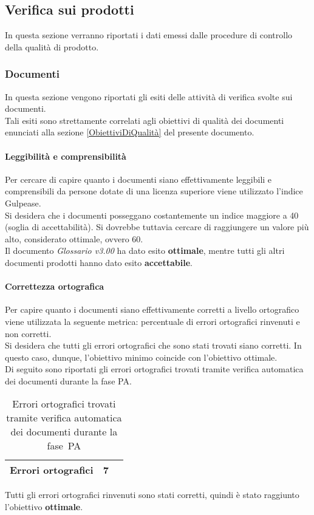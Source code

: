 \documentclass[../PianoDiQualifica.tex]{subfiles}
\begin{document}
\begin{appendices}
			
	\subsection{Verifica sui prodotti}
	In questa sezione verranno riportati i dati emessi dalle procedure di controllo della qualità di prodotto\g.
		\subsubsection{Documenti}
		In questa sezione vengono riportati gli esiti delle attività di verifica svolte sui documenti.\\
		Tali esiti sono strettamente correlati agli obiettivi di qualità dei documenti enunciati alla sezione \ref{ObiettiviDiQualità} del presente documento.
			
			\paragraph{Leggibilità e comprensibilità}
			Per cercare di capire quanto i documenti siano effettivamente leggibili e comprensibili da persone dotate di una licenza superiore viene utilizzato l’indice Gulpease\g.\\
			Si desidera che i documenti posseggano costantemente un indice maggiore a 40 (soglia di accettabilità). Si dovrebbe tuttavia cercare di raggiungere un valore più alto, considerato ottimale, ovvero 60.\\
			Il documento \textit{Glossario v3.00} ha dato esito \textbf{ottimale}, mentre tutti gli altri documenti prodotti hanno dato esito \textbf{accettabile}.
			
			\paragraph{Correttezza ortografica}
			Per capire quanto i documenti siano effettivamente corretti a livello ortografico viene utilizzata la seguente metrica: percentuale di errori ortografici rinvenuti e non corretti.\\
			Si desidera che tutti gli errori ortografici che sono stati trovati siano corretti. In questo caso, dunque, l'obiettivo minimo coincide con l'obiettivo ottimale.\\
			Di seguito sono riportati gli errori ortografici trovati tramite verifica automatica dei documenti durante la fase PA.
			\begin{table}[H]
				\centering
				\begin{tabular}{l * {2}{c}}
					\midrule
					Errori ortografici & 7 \\
					\midrule
				\end{tabular}
				\caption{Errori ortografici trovati tramite verifica automatica dei documenti durante la fase\g\ PA}
				\label{tab:errori_automatica}
			\end{table}
			Tutti gli errori ortografici rinvenuti sono stati corretti, quindi è stato raggiunto l'obiettivo \textbf{ottimale}.
			

\end{appendices}
\end{document}
